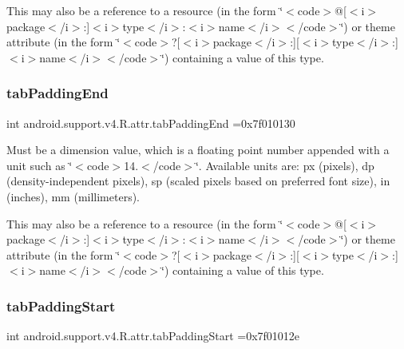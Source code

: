 This may also be a reference to a resource (in the form \char`\"{}$<$code$>$@\mbox{[}$<$i$>$package$<$/i$>$\+:\mbox{]}$<$i$>$type$<$/i$>$\+:$<$i$>$name$<$/i$>$$<$/code$>$\char`\"{}) or theme attribute (in the form \char`\"{}$<$code$>$?\mbox{[}$<$i$>$package$<$/i$>$\+:\mbox{]}\mbox{[}$<$i$>$type$<$/i$>$\+:\mbox{]}$<$i$>$name$<$/i$>$$<$/code$>$\char`\"{}) containing a value of this type. \mbox{\label{classandroid_1_1support_1_1v4_1_1R_1_1attr_a3c00f29ec303b55023371ac28507ec3b}} 
\subsubsection{\texorpdfstring{tab\+Padding\+End}{tabPaddingEnd}}
{\footnotesize\ttfamily int android.\+support.\+v4.\+R.\+attr.\+tab\+Padding\+End =0x7f010130\hspace{0.3cm}{\ttfamily [static]}}

Must be a dimension value, which is a floating point number appended with a unit such as \char`\"{}$<$code$>$14.\+5sp$<$/code$>$\char`\"{}. Available units are\+: px (pixels), dp (density-\/independent pixels), sp (scaled pixels based on preferred font size), in (inches), mm (millimeters). 

This may also be a reference to a resource (in the form \char`\"{}$<$code$>$@\mbox{[}$<$i$>$package$<$/i$>$\+:\mbox{]}$<$i$>$type$<$/i$>$\+:$<$i$>$name$<$/i$>$$<$/code$>$\char`\"{}) or theme attribute (in the form \char`\"{}$<$code$>$?\mbox{[}$<$i$>$package$<$/i$>$\+:\mbox{]}\mbox{[}$<$i$>$type$<$/i$>$\+:\mbox{]}$<$i$>$name$<$/i$>$$<$/code$>$\char`\"{}) containing a value of this type. \mbox{\label{classandroid_1_1support_1_1v4_1_1R_1_1attr_a4a489149b8ed97ee692ee9e9dbd14715}} 
\subsubsection{\texorpdfstring{tab\+Padding\+Start}{tabPaddingStart}}
{\footnotesize\ttfamily int android.\+support.\+v4.\+R.\+attr.\+tab\+Padding\+Start =0x7f01012e\hspace{0.3cm}{\ttfamily [static]}}

